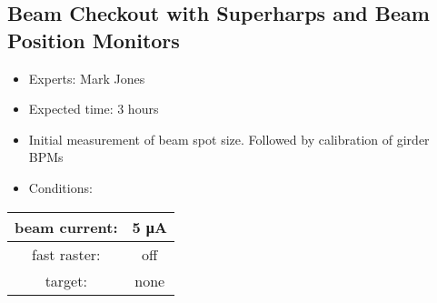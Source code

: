 \documentclass[]{article}
\begin{document}
	
\subsection{Beam Checkout with Superharps and Beam Position
			Monitors}\label{beam-checkout-with-superharps-and-beam-position-monitors}
	
	\begin{itemize}
		\item
		Experts: Mark Jones
		\item
		Expected time: 3 hours
		\item
		Initial measurement of beam spot size. Followed by calibration of
		girder BPMs
		\item
		Conditions:
	\end{itemize}
	
	\begin{tabular}[]{|c|c|} \hline\hline
		beam current: & 5 μA\\ \hline
		fast raster: & off\\ \hline
		target: & none\\ \hline
	\end{tabular}
	
\end{document}
